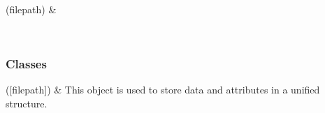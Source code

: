 \documentclass[letterpaper,10pt,english]{sphinxmanual}
\begin{document}
\begin{savenotes}\sphinxattablestart
\sphinxthistablewithglobalstyle
\sphinxthistablewithnovlinesstyle
\centering
\begin{tabulary}{\linewidth}[t]{}
\sphinxtoprule
\sphinxtableatstartofbodyhook
\sphinxAtStartPar
{\hyperref[\detokenize{_autosummary/HDF5_BLS.wrapper:HDF5_BLS.wrapper.is_tempfile}]{}}(filepath)
&
\sphinxAtStartPar

\\
\sphinxbottomrule
\end{tabulary}
\sphinxtableafterendhook\par
\sphinxattableend\end{savenotes}
\subsubsection*{Classes}


\begin{savenotes}\sphinxattablestart
\sphinxthistablewithglobalstyle
\sphinxthistablewithnovlinesstyle
\centering
\begin{tabulary}{\linewidth}[t]{}
\sphinxtoprule
\sphinxtableatstartofbodyhook
\sphinxAtStartPar
{\hyperref[\detokenize{_autosummary/HDF5_BLS.wrapper:HDF5_BLS.wrapper.Wrapper}]{}}({[}filepath{]})
&
\sphinxAtStartPar
This object is used to store data and attributes in a unified structure.
\\
\sphinxbottomrule
\end{tabulary}
\sphinxtableafterendhook\par
\sphinxattableend\end{savenotes}
\end{document}
